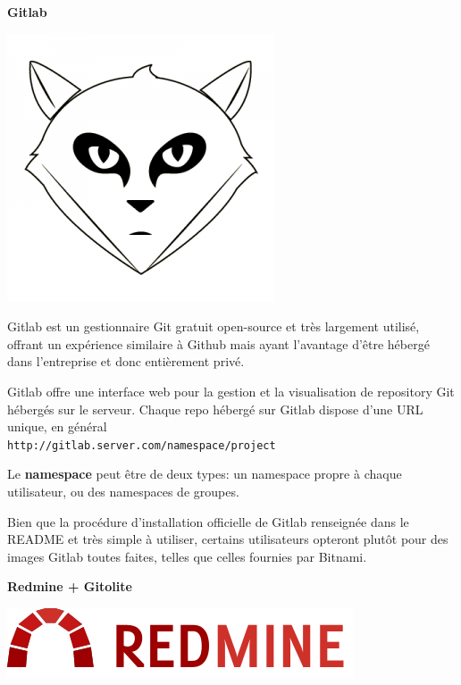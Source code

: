 \documentclass[a4paper]{../../common/tufte-latex/tufte-handout}
\begin{document}
\textbf{Gitlab}

\begin{marginfigure}%
  \centering
  \includegraphics[width=0.6\linewidth]{gitlab-logo.png}
  \label{fig:gitlablogo}
\end{marginfigure}

\noindent Gitlab est un gestionnaire Git gratuit open-source et très largement utilisé, offrant un expérience similaire à Github mais ayant l'avantage d'être  hébergé dans l'entreprise et donc entièrement privé.

Gitlab offre une interface web pour la gestion et la visualisation de repository Git hébergés sur le serveur.
Chaque repo hébergé sur Gitlab dispose d'une URL unique, en général \\ \noindent \texttt{http://gitlab.server.com/namespace/project}

Le \textbf{namespace} peut être de deux types: un namespace propre à chaque utilisateur, ou des namespaces de groupes.

Bien que la procédure d'installation officielle de Gitlab renseignée dans le README et très simple à utiliser, certains utilisateurs opteront plutôt pour des images Gitlab toutes faites, telles que celles fournies par Bitnami. 

\textbf{Redmine + Gitolite}

\begin{marginfigure}%
  \centering
  \includegraphics[width=0.6\linewidth]{redmine-logo.png}
  \label{fig:gitlablogo}
\end{marginfigure}
\end{document}
